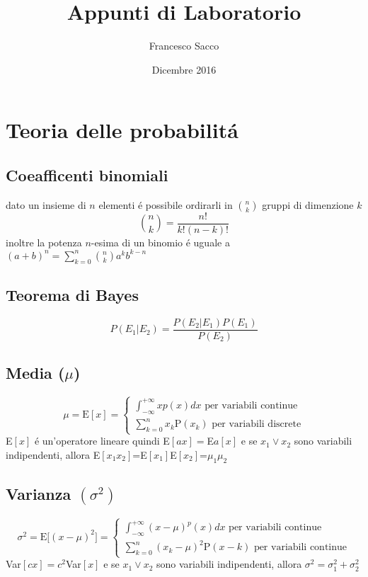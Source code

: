 \documentclass{exam}
\date{Dicembre 2016}
\title{Appunti di Laboratorio}
\author{Francesco Sacco}
\begin{document}
  \section{Teoria delle probabilit\'a}
    \subsection{Coeafficenti binomiali}
      dato un insieme di $n$ elementi \'e possibile ordirarli in 
      $\binom{n}{k}$ gruppi di dimenzione $k$
      \[ \binom{n}{k}=\frac{n!}{k!(n-k)!} \]
      inoltre la potenza $n$-esima di un binomio \'e uguale a 
      \(\displaystyle(a+b)^n=\sum_{k=0}^n \binom{n}{k}a^k b^{k-n} \)
      
    \subsection{Teorema di Bayes}
      \[P(E_{1}|E_{2})=\frac{P(E_{2}|E_{1})P(E_{1})}{P(E_{2})} \]
      
    \subsection{Media ($\mu$)}
      \begin{displaymath}
        \mu=\textrm{E}[x]=\begin{cases}
            \displaystyle \int_{-\infty}^{+\infty}xp(x)dx \textrm{ per variabili continue}\\
            \displaystyle \sum_{k=0}^{n}x_{k}\textrm{P}(x_{k})
            \textrm{ per variabili discrete}
          \end{cases}
      \end{displaymath}
      E$[x]$ \'e un'operatore lineare quindi E$[ax]=$E$a[x]$
      e se $x_{1} \lor x_{2}$ sono variabili indipendenti, allora
      E$[x_{1}x_{2}]$=E$[x_{1}]$E$[x_{2}]$=$\mu_{1}\mu_{2}$
       
    \subsection{Varianza $(\sigma^2)$}
      \[
        \sigma^2=\textrm{E}\bigr[(x-\mu)^2\bigr]=\begin{cases}
            \displaystyle \int_{-\infty}^{+\infty}(x-\mu)^p(x)dx 
            \textrm{ per variabili continue}\\
            \displaystyle \sum_{k=0}^{n}(x_{k}-\mu)^2\textrm{P}(x-{k})
            \textrm { per variabili continue}
          \end{cases}
      \]
      Var$[cx]=c^2$Var$[x]$ e se $x_{1} \lor x_{2}$ sono variabili indipendenti, allora
      $\sigma^2=\sigma_{1}^2+\sigma_{2}^2$
\end{document}
